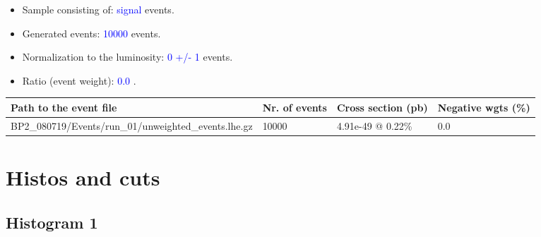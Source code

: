 \documentclass[a4paper, 10pt]{article}
\begin{document}
\begin{itemize}
  \item Sample consisting of: \textcolor{blue}{signal}  events.
   \item Generated events: \textcolor{blue}{10000 }  events.
   \item Normalization to the luminosity: \textcolor{blue}{0}\textcolor{blue}{ +/\-- }\textcolor{blue}{1 }  events.
   \item Ratio (event weight): \textcolor{blue}{0.0 } .  
 
\end{itemize}
\begin{table}[H]
  \begin{center}
    \begin{tabular}{|m{55.0mm}|m{25.0mm}|m{30.0mm}|m{30.0mm}|}
      \hline
      {\cellcolor{yellow}         Path to the event file}& {\cellcolor{yellow}         Nr. of events}& {\cellcolor{yellow}         Cross section (pb)}& {\cellcolor{yellow}         Negative wgts (\%)}\\
      \hline
      {\cellcolor{white}          BP2\_080719/\-Events/\-run\_01/\-unweighted\_events.lhe.gz}& {\cellcolor{white}          10000}& {\cellcolor{white}          4.91e-49 @ 0.22\%}& {\cellcolor{white}          0.0}\\
\hline
    \end{tabular}
  \end{center}
\end{table}

\newpage
\section{ Histos and cuts}

\subsection{ Histogram 1}
\end{document}
